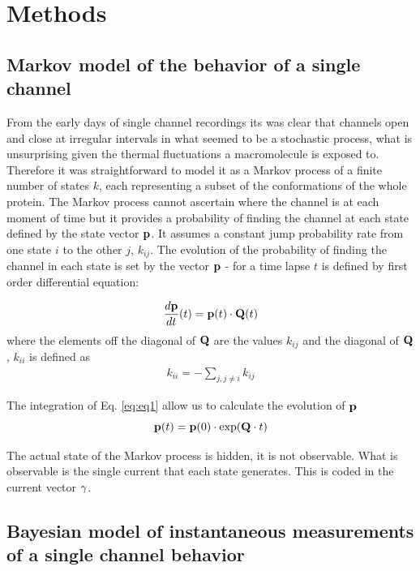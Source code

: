 \documentclass[pdflatex,sn-mathphys-num]{sn-jnl}%
\theoremstyle{thmstyleone}%
\theoremstyle{thmstyletwo}%
\theoremstyle{thmstylethree}%
\begin{document}
\section{Methods}
\label{sec11}


\subsection{Markov model of the behavior of a single channel}

From the early days of single channel recordings its was clear that channels open and close at irregular intervals in what seemed to be a stochastic process, what is unsurprising given the thermal fluctuations a macromolecule is exposed to. Therefore it was straightforward to model it as a Markov process of a finite number of states $k$, each representing a subset of the conformations of the whole protein. The Markov process cannot ascertain where the channel is at each moment of time but it provides a probability of finding the channel at each state defined by the state vector $\bold p$. It assumes a constant jump probability rate from one state $i$  to the other $j$, $k_{ij}$. The evolution of the probability of finding the channel in each state is set by the vector $\bold p$ - for a time lapse $t$ is defined by first order differential equation: 

\begin{equation}
\frac {d \bold p}{dt}(t) = \bold p(t) \cdot \bold Q (t)
\label{eq:eq1}
\end{equation}
where the elements off the diagonal of $\bold Q$ are the values $k_{ij}$ and the diagonal of $\bold Q$, $k_{ii}$ is defined as
\begin{align}
k_{ii}=- \sum_{j, j \neq i} k_{ij} \label{eq2}
\end{align}



The integration of Eq. \ref{eq:eq1} allow us to calculate the evolution of $ \bold p$
\begin{equation}
\bold p(t) = \bold p(0) \cdot \exp(\bold Q \cdot t)
\label{eq:eq2}
\end{equation}
 

The actual state of the Markov process is hidden, it is not observable. What is observable is the single current that each state generates. This is coded in the current vector $\bold \gamma$. 


\subsection{Bayesian model of instantaneous measurements of a single channel behavior}
\end{document}
